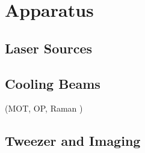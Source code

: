 
\chapter{Apparatus}
\label{ch:apparatus}

\section{Laser Sources}
\label{ch:apparatus:laser}

\section{Cooling Beams}
\label{ch:apparatus:cooling}

(MOT, OP, Raman )

\section{Tweezer and Imaging}
\label{ch:apparatus:tweezer}
